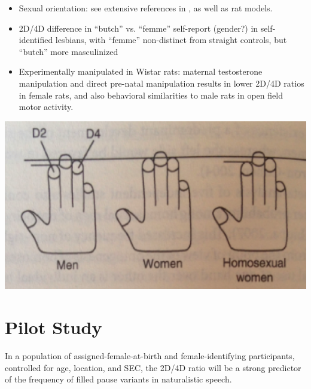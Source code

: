 \documentclass[a0,portrait]{a0poster}
\begin{document}
\begin{multicols}{2}
\begin{multicols}{2}
\begin{itemize}
	\item Sexual orientation: see extensive references in \citet{balthazart2011}, as well as rat models.
	\item 2D/4D difference in ``butch'' vs. ``femme'' self-report (gender?) in self-identified lesbians, with ``femme'' non-distinct from straight controls, but ``butch'' more masculinized \citep{brownetal2002}
	\item Experimentally manipulated in Wistar rats: maternal testosterone manipulation and direct pre-natal manipulation results in lower 2D/4D ratios in female rats, and also behavioral similarities to male rats in open field motor activity\citep{talarovicovaetal2009}.
\end{itemize}

\begin{center}
  \includegraphics[width=0.5\linewidth]{balthazart108hands.png}
  \end{center}
\end{multicols}


\section*{Pilot Study}


In a population of assigned-female-at-birth and female-identifying participants, controlled for age, location, and SEC, the 2D/4D ratio will be a strong predictor of the frequency of filled pause variants in naturalistic speech.


\end{multicols}
\end{document}
